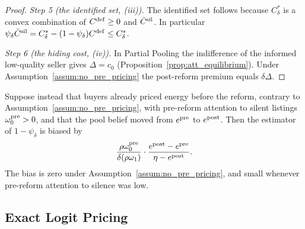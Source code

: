 \begin{proof}
\emph{Step 5 (the identified set, (iii)).} The identified set follows because $C^*_\delta$ is a convex combination of $C^{\rm def}\ge0$ and $\bar C^{\rm sil}$. In particular $\psi_\delta\bar C^{\rm sil}=C^*_\delta-(1-\psi_\delta)C^{\rm def}\le C^*_\delta$.

\emph{Step 6 (the hiding cost, (iv)).} In Partial Pooling the indifference of the informed low-quality seller gives $\Delta=c_0$ (Proposition~\ref{prop:att_equilibrium}). Under Assumption~\ref{assum:no_pre_pricing} the post-reform premium equals $\delta\Delta$.
\end{proof}

Suppose instead that buyers already priced energy before the reform, contrary to Assumption~\ref{assum:no_pre_pricing}, with pre-reform attention to silent listings $\omega_0^{\rm pre}>0$, and that the pool belief moved from $e^{\rm pre}$ to $e^{\rm post}$. Then the estimator of $1-\psi_\delta$ is biased by
\begin{equation*}
    \frac{\rho\omega_0^{\rm pre}}{\delta(\rho\omega_1)}\cdot\frac{e^{\rm post}-e^{\rm pre}}{\eta-e^{\rm post}}.
\end{equation*}
The bias is zero under Assumption~\ref{assum:no_pre_pricing}, and small whenever pre-reform attention to silence was low.


\subsection*{Exact Logit Pricing}
\label{app:att_exact}

